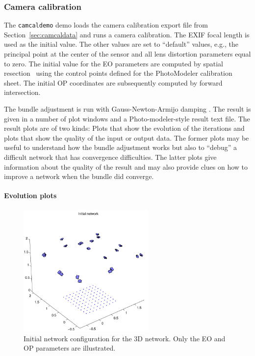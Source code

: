 \documentclass{article}
\begin{document}
\subsubsection{Camera calibration}
\label{sec:org3797f67}

The \texttt{camcaldemo} demo loads the camera calibration export file from
Section~\ref{sec:camcaldata} and runs a camera calibration. The
EXIF focal length is used as the initial value. The other values are
set to ``default'' values, e.g., the principal point at the center of
the sensor and all lens distortion parameters equal to zero. The
initial value for the EO parameters are computed by spatial
resection~\citep[Chap.~11.1.3.4]{Haralick1994:Review,McGlone2004:Manual}
using the control points defined for the PhotoModeler calibration
sheet. The initial OP coordinates are subsequently computed by forward
intersection.

The bundle adjustment is run with Gauss-Newton-Armijo damping
\citep{Borlin2013:Bundle}. The result is given in a number of plot
windows and a Photo-modeler-style result text file. The result plots
are of two kinds: Plots that show the evolution of the iterations and
plots that show the quality of the input or output data. The former
plots may be useful to understand how the bundle adjustment works but
also to ``debug'' a difficult network that has convergence
difficulties. The latter plots give information about the quality of
the result and may also provide clues on how to improve a network when
the bundle did converge.

\paragraph{Evolution plots}
\label{sec:org43d1924}

\begin{figure}[tbp]
\centering
\includegraphics[width=0.6\textwidth]{./ill/ccamx0.pdf}
\caption{\label{fig:camx0}
Initial network configuration for the 3D network. Only the EO and OP parameters are illustrated.}
\end{figure}
\end{document}
